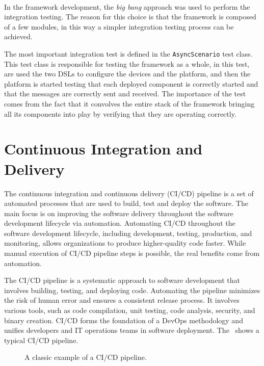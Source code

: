 \paragraph*{}

In the framework development, the \emph{big bang} approach was used to perform the integration testing. The reason for this choice is that
the framework is composed of a few modules, in this way a simpler integration testing process can be achieved.

The most important integration test is defined in the \texttt{AsyncScenario} test class. This test class is responsible for testing the
framework as a whole, in this test, are used the two DSLs to configure the devices and the platform, and then the platform is started testing
that each deployed component is correctly started and that the messages are correctly sent and received.
The importance of the test comes from the fact that it convolves the entire stack of the framework bringing all its components into play by verifying
that they are operating correctly.

\section{Continuous Integration and Delivery}
\label{sec:ci-cd}

The continuous integration and continuous delivery (CI/CD) pipeline is a set of automated processes that are used to build, test and deploy
the software. The main focus is on improving the software delivery throughout the software development lifecycle via automation.
Automating CI/CD throughout the software development lifecycle, including development, testing, production, and monitoring, allows organizations to
produce higher-quality code faster. While manual execution of CI/CD pipeline steps is possible, the real benefits come from automation.

The CI/CD pipeline is a systematic approach to software development that involves building, testing, and deploying code. Automating the pipeline
minimizes the risk of human error and ensures a consistent release process. It involves various tools, such as code compilation, unit testing, code
analysis, security, and binary creation.
CI/CD forms the foundation of a DevOps methodology and unifies developers and IT operations teams in software deployment.
The~ shows a typical CI/CD pipeline.

\begin{figure}
	\centering
	\caption{A classic example of a CI/CD pipeline.}
	\label{fig:ci-cd}
\end{figure}


